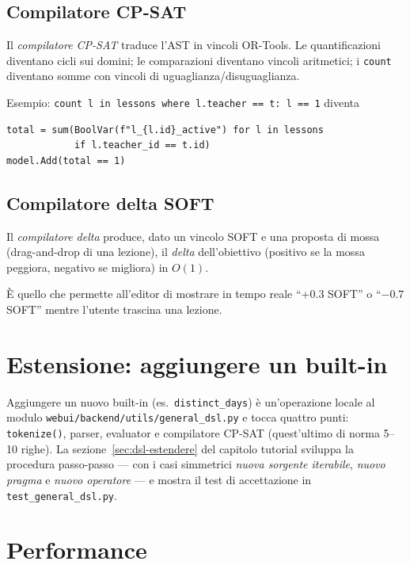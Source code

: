 \subsection{Compilatore CP-SAT}

\begin{defbox}
Il \emph{compilatore CP-SAT} traduce l'AST in vincoli OR-Tools.
Le quantificazioni diventano cicli sui domini; le
comparazioni diventano vincoli aritmetici; i \texttt{count}
diventano somme con vincoli di uguaglianza/disuguaglianza.
\end{defbox}

Esempio: \texttt{count l in lessons where l.teacher == t: l == 1}
diventa
\begin{lstlisting}[style=py]
total = sum(BoolVar(f"l_{l.id}_active") for l in lessons
            if l.teacher_id == t.id)
model.Add(total == 1)
\end{lstlisting}

\subsection{Compilatore delta SOFT}

\begin{defbox}
Il \emph{compilatore delta} produce, dato un vincolo SOFT e
una proposta di mossa (drag-and-drop di una lezione), il
\emph{delta} dell'obiettivo (positivo se la mossa peggiora,
negativo se migliora) in $O(1)$.
\end{defbox}

\`E quello che permette all'editor di mostrare in tempo reale
``+0.3 SOFT'' o ``$-0.7$ SOFT'' mentre l'utente trascina una
lezione.

\section{Estensione: aggiungere un built-in}

Aggiungere un nuovo built-in (es.\ \texttt{distinct\_days}) \`e
un'operazione locale al modulo
\texttt{webui/backend/utils/general\_dsl.py} e tocca quattro punti:
\texttt{tokenize()}, parser, evaluator e compilatore CP-SAT
(quest'ultimo di norma 5--10 righe). La
sezione~\ref{sec:dsl-estendere} del capitolo tutorial sviluppa
la procedura passo-passo --- con i casi simmetrici
\emph{nuova sorgente iterabile}, \emph{nuovo pragma} e
\emph{nuovo operatore} --- e mostra il test di accettazione in
\texttt{test\_general\_dsl.py}.

\section{Performance}

